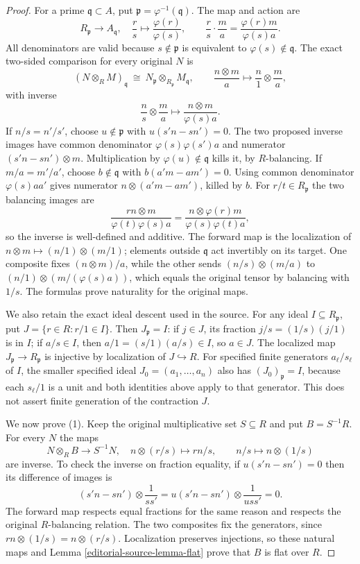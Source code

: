 \begin{proof}
For a prime $\mathfrak q\subset A$, put
$\mathfrak p=\varphi^{-1}(\mathfrak q)$. The map and action are
$$
R_{\mathfrak p}\longrightarrow A_{\mathfrak q},\quad
\frac rs\longmapsto\frac{\varphi(r)}{\varphi(s)},
\qquad
\frac rs\cdot\frac ma=\frac{\varphi(r)m}{\varphi(s)a}.
$$
All denominators are valid because $s\notin\mathfrak p$
is equivalent to $\varphi(s)\notin\mathfrak q$.
The exact two-sided comparison for every original $N$ is
$$
(N\otimes_R M)_{\mathfrak q}
\ \cong\ N_{\mathfrak p}\otimes_{R_{\mathfrak p}}M_{\mathfrak q},
\qquad
\frac{n\otimes m}{a}\longmapsto\frac n1\otimes\frac ma,
$$
with inverse
$$
\frac ns\otimes\frac ma\longmapsto
\frac{n\otimes m}{\varphi(s)a}.
$$
If $n/s=n'/s'$, choose $u\notin\mathfrak p$ with
$u(s'n-sn')=0$. The two proposed inverse images have
common denominator $\varphi(s)\varphi(s')a$ and numerator
$(s'n-sn')\otimes m$. Multiplication by
$\varphi(u)\notin\mathfrak q$ kills it, by $R$-balancing.
If $m/a=m'/a'$, choose $b\notin\mathfrak q$ with
$b(a'm-am')=0$. Using common denominator $\varphi(s)aa'$
gives numerator $n\otimes(a'm-am')$, killed by $b$.
For $r/t\in R_{\mathfrak p}$ the two balancing images are
$$
\frac{rn\otimes m}{\varphi(t)\varphi(s)a}
=\frac{n\otimes\varphi(r)m}{\varphi(s)\varphi(t)a},
$$
so the inverse is well-defined and additive.
The forward map is the localization of
$n\otimes m\mapsto(n/1)\otimes(m/1)$; elements outside
$\mathfrak q$ act invertibly on its target.
One composite fixes $(n\otimes m)/a$, while the other
sends $(n/s)\otimes(m/a)$ to
$(n/1)\otimes(m/(\varphi(s)a))$, which equals the
original tensor by balancing with $1/s$.
The formulas prove naturality for the original maps.

We also retain the exact ideal descent used in the source.
For any ideal $I\subseteq R_{\mathfrak p}$, put
$J=\{r\in R:r/1\in I\}$. Then $J_{\mathfrak p}=I$:
if $j\in J$, its fraction $j/s=(1/s)(j/1)$ is in $I$;
if $a/s\in I$, then $a/1=(s/1)(a/s)\in I$, so $a\in J$.
The localized map $J_{\mathfrak p}\to R_{\mathfrak p}$ is
injective by localization of $J\hookrightarrow R$.
For specified finite generators $a_\ell/s_\ell$ of $I$,
the smaller specified ideal $J_0=(a_1,\ldots,a_n)$ also
has $(J_0)_{\mathfrak p}=I$, because each $s_\ell/1$ is
a unit and both identities above apply to that generator.
This does not assert finite generation of the contraction $J$.

We now prove (1). Keep the original multiplicative set
$S\subseteq R$ and put $B=S^{-1}R$.
For every $N$ the maps
$$
N\otimes_R B\longrightarrow S^{-1}N,\quad
n\otimes(r/s)\longmapsto rn/s,
\qquad
n/s\longmapsto n\otimes(1/s)
$$
are inverse. To check the inverse on fraction equality,
if $u(s'n-sn')=0$ then its difference of images is
$$
(s'n-sn')\otimes\frac1{ss'}
=u(s'n-sn')\otimes\frac1{uss'}=0.
$$
The forward map respects equal fractions for the same
reason and respects the original $R$-balancing relation.
The two composites fix the generators, since
$rn\otimes(1/s)=n\otimes(r/s)$.
Localization preserves injections, so these natural maps
and Lemma \ref{editorial-source-lemma-flat} prove that $B$ is flat over $R$.


\end{proof}
